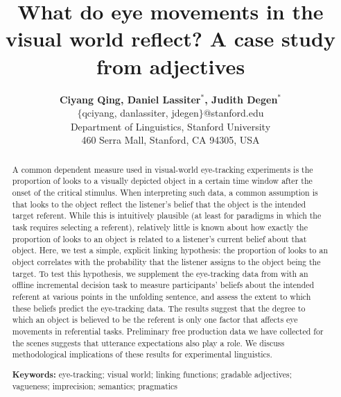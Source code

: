 \documentclass[10pt,letterpaper]{article}
\title{What do eye movements in the visual world reflect? A case study from adjectives}
\author{{\large \bf Ciyang Qing, Daniel Lassiter$^*$, Judith Degen$^*$} \\ 
  {$\{$qciyang, danlassiter, jdegen$\}$@stanford.edu} \\
  Department of Linguistics, Stanford University\\
  460 Serra Mall, Stanford, CA 94305, USA}
\begin{document}
\maketitle


\begin{abstract}

A common dependent measure used in visual-world eye-tracking experiments is the proportion of looks to a visually depicted object in a certain time window after the onset of the critical stimulus. When interpreting such data, a common assumption is that looks to the object reflect the listener's belief that the object is the intended target referent. While this is intuitively plausible (at least for paradigms in which the task requires selecting a referent), relatively little is known about how exactly the proportion of looks to an object is related to a listener's current belief about that object. Here, we test a simple, explicit linking hypothesis: the proportion of looks to an object correlates with the probability that the listener assigns to the object being the target. To test this hypothesis, we supplement the eye-tracking data from  with an offline incremental decision task to measure participants' beliefs about the intended referent at various points in the unfolding sentence, and assess the extent to which these beliefs predict the eye-tracking data.
The results suggest that the degree to which an object is believed to be the referent is only one factor that affects eye movements in referential tasks. 
Preliminary free production data we have collected for the scenes suggests that utterance expectations also play a role. 
We discuss methodological implications of these results for experimental linguistics.

\textbf{Keywords:} 
eye-tracking; visual world; linking functions; gradable adjectives; vagueness; imprecision; semantics; pragmatics
\end{abstract}
\end{document}

